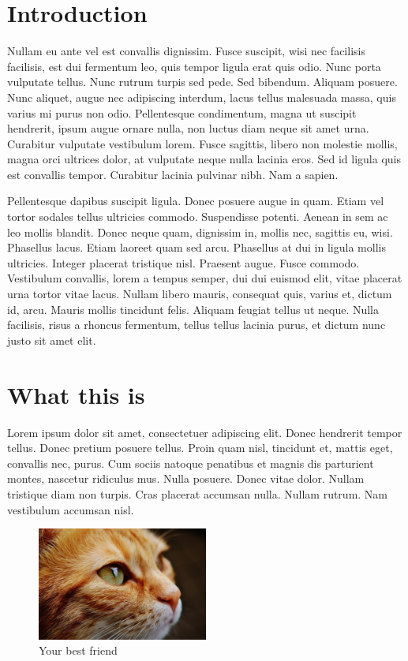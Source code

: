 \documentclass[a4paper]{article}
\begin{document}
\section{Introduction}

Nullam eu ante vel est convallis dignissim.  Fusce suscipit, wisi nec facilisis
facilisis, est dui fermentum leo, quis tempor ligula erat quis odio.  Nunc porta
vulputate tellus.  Nunc rutrum turpis sed pede.  Sed bibendum.  Aliquam posuere.
Nunc aliquet, augue nec adipiscing interdum, lacus tellus malesuada massa, quis
varius mi purus non odio.  Pellentesque condimentum, magna ut suscipit hendrerit,
ipsum augue ornare nulla, non luctus diam neque sit amet urna.  Curabitur
vulputate vestibulum lorem.  Fusce sagittis, libero non molestie mollis, magna
orci ultrices dolor, at vulputate neque nulla lacinia eros.  Sed id ligula quis
est convallis tempor.  Curabitur lacinia pulvinar nibh.  Nam a sapien.

Pellentesque dapibus suscipit ligula.  Donec posuere augue in quam.  Etiam vel
tortor sodales tellus ultricies commodo.  Suspendisse potenti.  Aenean in sem ac
leo mollis blandit.  Donec neque quam, dignissim in, mollis nec, sagittis eu,
wisi.  Phasellus lacus.  Etiam laoreet quam sed arcu.  Phasellus at dui in ligula
mollis ultricies.  Integer placerat tristique nisl.  Praesent augue.  Fusce
commodo.  Vestibulum convallis, lorem a tempus semper, dui dui euismod elit,
vitae placerat urna tortor vitae lacus.  Nullam libero mauris, consequat quis,
varius et, dictum id, arcu.  Mauris mollis tincidunt felis.  Aliquam feugiat
tellus ut neque.  Nulla facilisis, risus a rhoncus fermentum, tellus tellus
lacinia purus, et dictum nunc justo sit amet elit.

\newpage

\section{What this is}

Lorem ipsum dolor sit amet, consectetuer adipiscing elit.  Donec hendrerit
tempor tellus.  Donec pretium posuere tellus.  Proin quam nisl, tincidunt et,
mattis eget, convallis nec, purus.  Cum sociis natoque penatibus et magnis
dis parturient montes, nascetur ridiculus mus.  Nulla posuere.  Donec vitae
dolor.  Nullam tristique diam non turpis.  Cras placerat accumsan nulla.
Nullam rutrum.  Nam vestibulum accumsan nisl.

\begin{figure}[h]
    \centering
    \includegraphics[width=0.5\textwidth]{cat.jpg} %
    \caption{Your best friend}
    \label{fig:example}
\end{figure}
\end{document}
